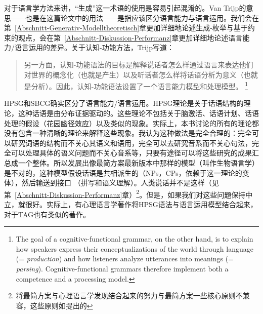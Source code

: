 对于语言学方法来讲，“生成”这一术语的使用是容易引起混淆的。Van Trijp的意思——也是在这篇论文中的用法——是指应该区分语言能力与语言运用。我们会在第~\ref{Abschnitt-Generativ-Modelltheoretisch}章更加详细地论述生成-枚举与基于约束的观点，会在第~\ref{Abschnitt-Diskussion-Performanz}章更加详细地论述语言能力/语言运用的差异。关于认知-功能方法，Trijp写道：
\begin{quotation}
另一方面，认知-功能语法的目标是解释说话者怎么样通过语言来表达他们对世界的概念化（也就是产生）以及听话者怎么样将话语分析为意义（也就是分析）。因此，认知-功能语法设置了一个语言能力模型和处理模型。 \citep[]{vanTrijp2013a}\footnote{%
The goal of a cognitive-functional grammar, on the other hand, is to explain
how speakers express their conceptualizations of the world through language
(= \emph{production}) and how listeners analyze utterances into meanings (= \emph{parsing}).
Cognitive-functional grammars therefore implement both a competence and a
processing model.}
\end{quotation}
HPSG和SBCG确实区分了语言能力/语言运用\citep{SW2011a}。HPSG理论是关于话语结构的理论，这种话语是由分布证据驱动的。这些理论不包括关于脑激活、话语计划、话语处理的假设（花园幽径效应）以及类似的现象。实际上，本书讨论的所有的理论都没有包含一种清晰的理论来解释这些现象。我认为这种做法是完全合理的：完全可以研究词语的结构而不关心其语义和语用，完全可以去研究音系而不关心句法，完全可以处理具体的语义问题而不关心音系等，只要有途径可以将这些研究的成果汇总成一个整体。所以发展出像最简方案\indexmpc 最新版本中那样的模型（叫作生物语言学）是不对的，这种模型假设话语是共相派生的（NPs，CPs，依赖于这一理论的变体），然后输送到接口 （拼写和语义理解）。人类说话并不是这样（见第~\ref{Abschnitt-Diskussion-Performanz}章）\footnote{%
将最简方案与心理语言学发现结合起来的努力与最简方案一些核心原则不兼容，这些原则如\citet{Chomsky2008a}提出的 
}。但是，如果我们对这些问题保持中立，就很好。实际上，有心理语言学著作将HPSG语法与语言运用模型结合起来\citep{Konieczny96a-u}，对于TAG也有类似的著作\citep{SJ93a,DK2008a-u}。
